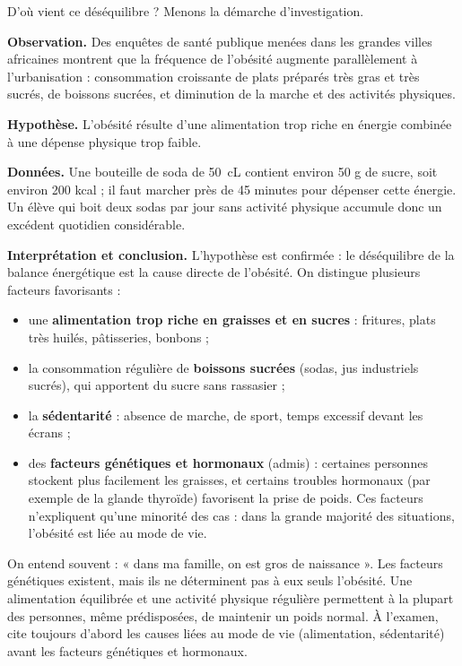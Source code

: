 \documentclass[11pt]{article}
\newcounter{popsec}
\newcounter{popsub}
\newcommand{\courssub}[1]{%
  \stepcounter{popsub}%
  \par\vspace{9pt}\noindent{\popxbold\fontsize{11.5}{13}\selectfont\color{popink}{\color{poporange}\thepopsec.\thepopsub}\hspace{6pt}#1}\par\nopagebreak\vspace{4pt}
}
\begin{document}
\courssub{Causes de l'obésité}

D'où vient ce déséquilibre ? Menons la démarche d'investigation.

\textbf{Observation.} Des enquêtes de santé publique menées dans les grandes villes africaines montrent que la fréquence de l'obésité augmente parallèlement à l'urbanisation : consommation croissante de plats préparés très gras et très sucrés, de boissons sucrées, et diminution de la marche et des activités physiques.

\textbf{Hypothèse.} L'obésité résulte d'une alimentation trop riche en énergie combinée à une dépense physique trop faible.

\textbf{Données.} Une bouteille de soda de \SI{50}{cL} contient environ 50 g de sucre, soit environ 200 kcal ; il faut marcher près de 45 minutes pour dépenser cette énergie. Un élève qui boit deux sodas par jour sans activité physique accumule donc un excédent quotidien considérable.

\textbf{Interprétation et conclusion.} L'hypothèse est confirmée : le déséquilibre de la balance énergétique est la cause directe de l'obésité. On distingue plusieurs facteurs favorisants :

\begin{itemize}
\item une \textbf{alimentation trop riche en graisses et en sucres} : fritures, plats très huilés, pâtisseries, bonbons ;
\item la consommation régulière de \textbf{boissons sucrées} (sodas, jus industriels sucrés), qui apportent du sucre sans rassasier ;
\item la \textbf{sédentarité} : absence de marche, de sport, temps excessif devant les écrans ;
\item des \textbf{facteurs génétiques et hormonaux} (admis) : certaines personnes stockent plus facilement les graisses, et certains troubles hormonaux (par exemple de la glande thyroïde) favorisent la prise de poids. Ces facteurs n'expliquent qu'une minorité des cas : dans la grande majorité des situations, l'obésité est liée au mode de vie.
\end{itemize}

\begin{attention}
On entend souvent : « dans ma famille, on est gros de naissance ». Les facteurs génétiques existent, mais ils ne déterminent pas à eux seuls l'obésité. Une alimentation équilibrée et une activité physique régulière permettent à la plupart des personnes, même prédisposées, de maintenir un poids normal. À l'examen, cite toujours d'abord les causes liées au mode de vie (alimentation, sédentarité) avant les facteurs génétiques et hormonaux.
\end{attention}
\end{document}
